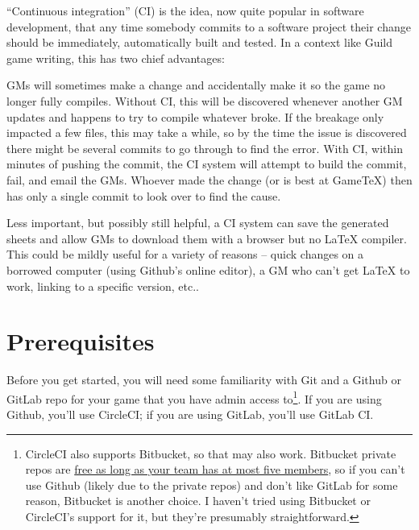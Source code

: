 \documentclass[green]{testgame}
\begin{document}
``Continuous integration'' (CI) is the idea, now quite popular in software development, that any time somebody commits to a software project their change should be immediately, automatically built and tested. In a context like Guild game writing, this has two chief advantages:
\begin{desc}
\item[Finding compile errors quickly] GMs will sometimes make a change and accidentally make it so the game no longer fully compiles. Without CI, this will be discovered whenever another GM updates and happens to try to compile whatever broke. If the breakage only impacted a few files, this may take a while, so by the time the issue is discovered there might be several commits to go through to find the error. With CI, within minutes of pushing the commit, the CI system will attempt to build the commit, fail, and email the GMs. Whoever made the change (or is best at GameTeX) then has only a single commit to look over to find the cause.
\item[Downloadable sheets without \LaTeX] Less important, but possibly still helpful, a CI system can save the generated sheets and allow GMs to download them with a browser but no \LaTeX{} compiler. This could be mildly useful for a variety of reasons -- quick changes on a borrowed computer (using Github's online editor), a GM who can't get \LaTeX{} to work, linking to a specific version, etc..
\end{desc}

\section{Prerequisites}

Before you get started, you will need some familiarity with Git and a Github or GitLab repo for your game that you have admin access to\footnote{CircleCI also supports Bitbucket, so that may also work. Bitbucket private repos are \href{https://bitbucket.org/product/pricing?tab=host-in-the-cloud}{free as long as your team has at most five members}, so if you can't use Github (likely due to the private repos) and don't like GitLab for some reason, Bitbucket is another choice. I haven't tried using Bitbucket or CircleCI's support for it, but they're presumably straightforward.}. If you are using Github, you'll use CircleCI; if you are using GitLab, you'll use GitLab CI.
\end{document}
